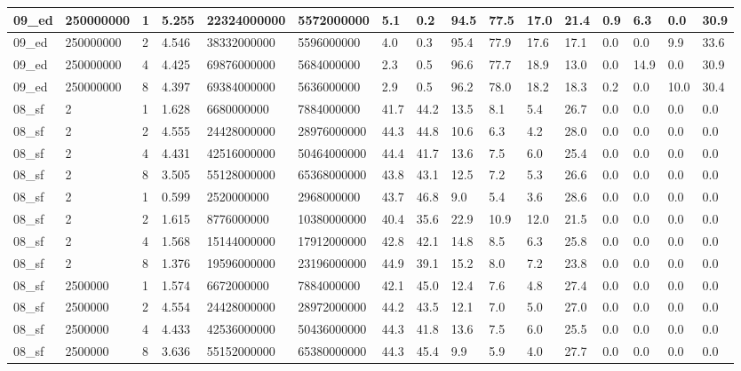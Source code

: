 \documentclass[12pt]{article}
\begin{document}
\begin{flushleft}
\begin{landscape}
\begin{tabular}{| l | l | l | l | l | l | l | l | l | l | l | l | l | l | l | l |}
		09\_ed & 250000000 & 1 & 5.255 & 22324000000 & 5572000000 & 5.1 & 0.2 & 94.5 & 77.5 & 17.0 & 21.4 & 0.9 & 6.3 & 0.0 & 30.9 \\ \hline
		09\_ed & 250000000 & 2 & 4.546 & 38332000000 & 5596000000 & 4.0 & 0.3 & 95.4 & 77.9 & 17.6 & 17.1 & 0.0 & 0.0 & 9.9 & 33.6 \\ \hline
		09\_ed & 250000000 & 4 & 4.425 & 69876000000 & 5684000000 & 2.3 & 0.5 & 96.6 & 77.7 & 18.9 & 13.0 & 0.0 & 14.9 & 0.0 & 30.9 \\ \hline
		09\_ed & 250000000 & 8 & 4.397 & 69384000000 & 5636000000 & 2.9 & 0.5 & 96.2 & 78.0 & 18.2 & 18.3 & 0.2 & 0.0 & 10.0 & 30.4 \\ \hline
		08\_sf & 2 & 1 & 1.628 & 6680000000 & 7884000000 & 41.7 & 44.2 & 13.5 & 8.1 & 5.4 & 26.7 & 0.0 & 0.0 & 0.0 & 0.0 \\ \hline
		08\_sf & 2 & 2 & 4.555 & 24428000000 & 28976000000 & 44.3 & 44.8 & 10.6 & 6.3 & 4.2 & 28.0 & 0.0 & 0.0 & 0.0 & 0.0 \\ \hline
		08\_sf & 2 & 4 & 4.431 & 42516000000 & 50464000000 & 44.4 & 41.7 & 13.6 & 7.5 & 6.0 & 25.4 & 0.0 & 0.0 & 0.0 & 0.0 \\ \hline
		08\_sf & 2 & 8 & 3.505 & 55128000000 & 65368000000 & 43.8 & 43.1 & 12.5 & 7.2 & 5.3 & 26.6 & 0.0 & 0.0 & 0.0 & 0.0 \\ \hline
		08\_sf & 2 & 1 & 0.599 & 2520000000 & 2968000000 & 43.7 & 46.8 & 9.0 & 5.4 & 3.6 & 28.6 & 0.0 & 0.0 & 0.0 & 0.0 \\ \hline
		08\_sf & 2 & 2 & 1.615 & 8776000000 & 10380000000 & 40.4 & 35.6 & 22.9 & 10.9 & 12.0 & 21.5 & 0.0 & 0.0 & 0.0 & 0.0 \\ \hline
		08\_sf & 2 & 4 & 1.568 & 15144000000 & 17912000000 & 42.8 & 42.1 & 14.8 & 8.5 & 6.3 & 25.8 & 0.0 & 0.0 & 0.0 & 0.0 \\ \hline
		08\_sf & 2 & 8 & 1.376 & 19596000000 & 23196000000 & 44.9 & 39.1 & 15.2 & 8.0 & 7.2 & 23.8 & 0.0 & 0.0 & 0.0 & 0.0 \\ \hline
		08\_sf & 2500000 & 1 & 1.574 & 6672000000 & 7884000000 & 42.1 & 45.0 & 12.4 & 7.6 & 4.8 & 27.4 & 0.0 & 0.0 & 0.0 & 0.0 \\ \hline
		08\_sf & 2500000 & 2 & 4.554 & 24428000000 & 28972000000 & 44.2 & 43.5 & 12.1 & 7.0 & 5.0 & 27.0 & 0.0 & 0.0 & 0.0 & 0.0 \\ \hline
		08\_sf & 2500000 & 4 & 4.433 & 42536000000 & 50436000000 & 44.3 & 41.8 & 13.6 & 7.5 & 6.0 & 25.5 & 0.0 & 0.0 & 0.0 & 0.0 \\ \hline
		08\_sf & 2500000 & 8 & 3.636 & 55152000000 & 65380000000 & 44.3 & 45.4 & 9.9 & 5.9 & 4.0 & 27.7 & 0.0 & 0.0 & 0.0 & 0.0 \\ \hline

\end{tabular}
\end{landscape}
\end{flushleft}
\end{document}
